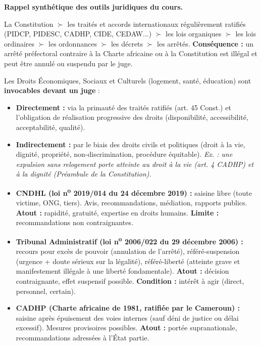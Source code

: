 \documentclass[11pt]{article}
\newcommand{\cle}[1]{{\popxbold\color{popdark}#1}}
\newcounter{popsec}
\newcounter{popsub}
\newcommand{\courssub}[1]{%
  \stepcounter{popsub}%
  \par\vspace{9pt}\noindent{\popxbold\fontsize{11.5}{13}\selectfont\color{popink}{\color{poporange}\thepopsec.\thepopsub}\hspace{6pt}#1}\par\nopagebreak\vspace{4pt}
}
\begin{document}
\courssub{Ressources à mobiliser}
\noindent \textbf{Rappel synthétique des outils juridiques du cours.}

\begin{definition}
La Constitution $\succ$ les traités et accords internationaux régulièrement ratifiés (PIDCP, PIDESC, CADHP, CIDE, CEDAW...) $\succ$ les lois organiques $\succ$ les lois ordinaires $\succ$ les ordonnances $\succ$ les décrets $\succ$ les arrêtés. \textbf{Conséquence :} un arrêté préfectoral contraire à la Charte africaine ou à la Constitution est illégal et peut être annulé ou suspendu par le juge.
\end{definition}

\begin{propriete}
Les Droits Économiques, Sociaux et Culturels (logement, santé, éducation) sont \textbf{invocables devant un juge} :
\begin{itemize}
    \item \textbf{Directement :} via la primauté des traités ratifiés (art. 45 Const.) et l'obligation de \cle{réalisation progressive} des droits (disponibilité, accessibilité, acceptabilité, qualité).
    \item \textbf{Indirectement :} par le biais des droits civils et politiques (droit à la vie, dignité, propriété, non-discrimination, procédure équitable). \emph{Ex. : une expulsion sans relogement porte atteinte au droit à la vie (art. 4 CADHP) et à la dignité (Préambule de la Constitution).}
\end{itemize}
\end{propriete}

\begin{aretenir}
\begin{itemize}
    \item \textbf{CNDHL (loi n\textsuperscript{o} 2019/014 du 24 décembre 2019) :} saisine libre (toute victime, ONG, tiers). Avis, recommandations, médiation, rapports publics. \textbf{Atout :} rapidité, gratuité, expertise en droits humains. \textbf{Limite :} recommandations non contraignantes.
    \item \textbf{Tribunal Administratif (loi n\textsuperscript{o} 2006/022 du 29 décembre 2006) :} recours pour excès de pouvoir (annulation de l'arrêté), référé-suspension (urgence + doute sérieux sur la légalité), référé-liberté (atteinte grave et manifestement illégale à une liberté fondamentale). \textbf{Atout :} décision contraignante, effet suspensif possible. \textbf{Condition :} intérêt à agir (direct, personnel, certain).
    \item \textbf{CADHP (Charte africaine de 1981, ratifiée par le Cameroun) :} saisine après épuisement des voies internes (sauf déni de justice ou délai excessif). Mesures provisoires possibles. \textbf{Atout :} portée supranationale, recommandations adressées à l'État partie.
\end{itemize}
\end{aretenir}
\end{document}
